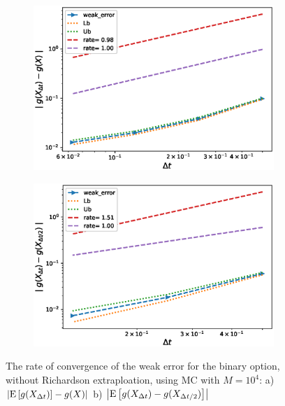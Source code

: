 \documentclass[11pt]{article}
\newcommand{\expt}[1]{\mathrm{E}\left[#1\right]}
\begin{document}
\begin{figure}[h!]
	\centering
	\begin{subfigure}{.4\textwidth}
		\centering
		\includegraphics[width=1\linewidth]{./figures/binary_weak_error/without_richardson/weak_convergence_order_binary_option_relative_M_10_4}
		\caption{}
		\label{fig:sub3}
	\end{subfigure}%
	\begin{subfigure}{.4\textwidth}
		\centering
		\includegraphics[width=1\linewidth]{./figures/binary_weak_error/without_richardson/weak_convergence_order_differences_binary_option_relative_M_10_4}
		\caption{}
		\label{fig:sub4}
	\end{subfigure}
	
	\caption{The rate of convergence of the weak error for the binary option, without Richardson extraploation, using MC with $M=10^4$: a) $\abs{\expt{g(X_{\Delta t})}-g(X)}$  b) $\abs{\expt{g(X_{\Delta t})-g(X_{\Delta t/2})}}$ }
	\label{fig:Weak_rate_binary_without_rich}
\end{figure}
\end{document}
